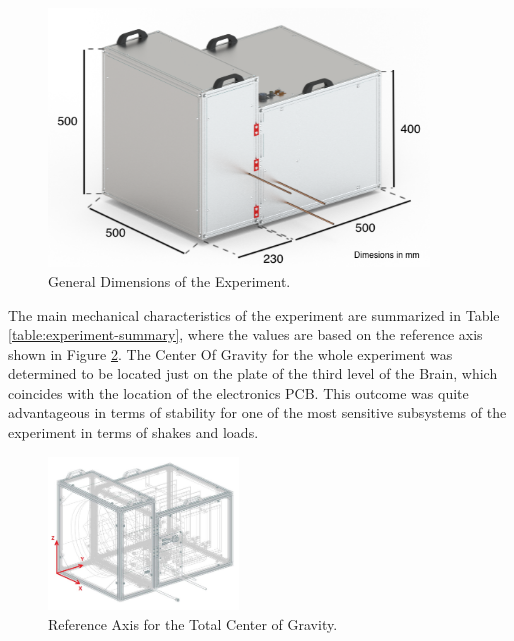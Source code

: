  \begin{figure}[H]
     \centering
     \includegraphics[width=0.9\textwidth]{4-experiment-design/img/Mechanical/Figure_14.png}
     \caption{General Dimensions of the Experiment.}
     \label{dimensions}
\end{figure}



The main mechanical characteristics of the experiment are summarized in Table \ref{table:experiment-summary}, where the values are based on the reference axis shown in Figure \ref{COG}. The Center Of Gravity for the whole experiment was determined to be located just on the plate of the third level of the Brain, which coincides with the location of the electronics PCB. This outcome was quite advantageous in terms of stability for one of the most sensitive subsystems of the experiment in terms of shakes and loads. 



 \begin{figure}[H]
     \centering
     \includegraphics[width=0.45\textwidth]{4-experiment-design/img/Mechanical/COG.jpg}
     \caption{Reference Axis for the Total Center of Gravity.}
     \label{COG}
\end{figure}

